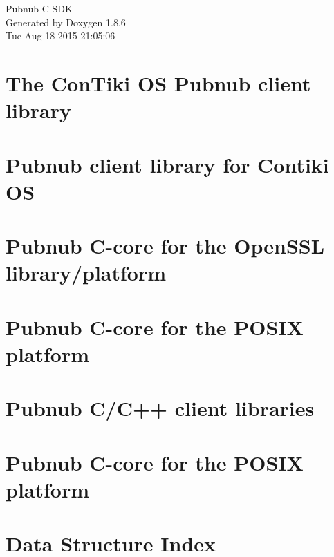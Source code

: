 \documentclass[twoside]{book}
\newcommand{\clearemptydoublepage}{%
  \newpage{\pagestyle{empty}\cleardoublepage}%
}
\begin{document}
\hypersetup{pageanchor=false}
\begin{titlepage}
\vspace*{7cm}
\begin{center}%
{\Large Pubnub C S\-D\-K }\\
\vspace*{1cm}
{\large Generated by Doxygen 1.8.6}\\
\vspace*{0.5cm}
{\small Tue Aug 18 2015 21:05:06}\\
\end{center}
\end{titlepage}
\clearemptydoublepage
\tableofcontents
\clearemptydoublepage
{}
\hypersetup{pageanchor=true}

\chapter{The Con\-Tiki O\-S Pubnub client library}
\label{index}\hypertarget{index}{}
\chapter{Pubnub client library for Contiki O\-S}
\label{md_contiki_README}
\hypertarget{md_contiki_README}{}

\chapter{Pubnub C-\/core for the Open\-S\-S\-L library/platform}
\label{md_openssl_README}
\hypertarget{md_openssl_README}{}

\chapter{Pubnub C-\/core for the P\-O\-S\-I\-X platform}
\label{md_posix_README}
\hypertarget{md_posix_README}{}

\chapter{Pubnub C/\-C++ client libraries}
\label{md_README}
\hypertarget{md_README}{}

\chapter{Pubnub C-\/core for the P\-O\-S\-I\-X platform}
\label{md_windows_README}
\hypertarget{md_windows_README}{}

\chapter{Data Structure Index}

\end{document}
